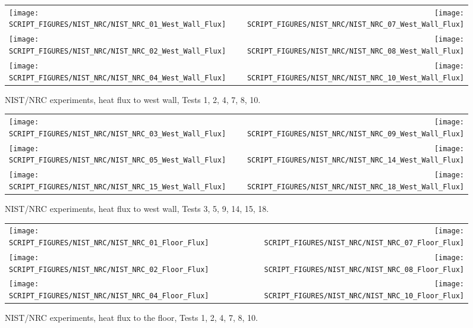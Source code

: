 \begin{figure}[p]
\begin{tabular*}{\textwidth}{l@{\extracolsep{\fill}}r}
\texttt{[image: SCRIPT\_FIGURES/NIST\_NRC/NIST\_NRC\_01\_West\_Wall\_Flux]} &
\texttt{[image: SCRIPT\_FIGURES/NIST\_NRC/NIST\_NRC\_07\_West\_Wall\_Flux]} \\
\texttt{[image: SCRIPT\_FIGURES/NIST\_NRC/NIST\_NRC\_02\_West\_Wall\_Flux]} &
\texttt{[image: SCRIPT\_FIGURES/NIST\_NRC/NIST\_NRC\_08\_West\_Wall\_Flux]} \\
\texttt{[image: SCRIPT\_FIGURES/NIST\_NRC/NIST\_NRC\_04\_West\_Wall\_Flux]} &
\texttt{[image: SCRIPT\_FIGURES/NIST\_NRC/NIST\_NRC\_10\_West\_Wall\_Flux]}
\end{tabular*}
\caption{NIST/NRC experiments, heat flux to west wall, Tests 1, 2, 4, 7, 8, 10.}
\label{NIST_NRC_West_Wall_Flux_Closed}
\end{figure}

\begin{figure}[p]
\begin{tabular*}{\textwidth}{l@{\extracolsep{\fill}}r}
\texttt{[image: SCRIPT\_FIGURES/NIST\_NRC/NIST\_NRC\_03\_West\_Wall\_Flux]} &
\texttt{[image: SCRIPT\_FIGURES/NIST\_NRC/NIST\_NRC\_09\_West\_Wall\_Flux]} \\
\texttt{[image: SCRIPT\_FIGURES/NIST\_NRC/NIST\_NRC\_05\_West\_Wall\_Flux]} &
\texttt{[image: SCRIPT\_FIGURES/NIST\_NRC/NIST\_NRC\_14\_West\_Wall\_Flux]} \\
\texttt{[image: SCRIPT\_FIGURES/NIST\_NRC/NIST\_NRC\_15\_West\_Wall\_Flux]} &
\texttt{[image: SCRIPT\_FIGURES/NIST\_NRC/NIST\_NRC\_18\_West\_Wall\_Flux]}
\end{tabular*}
\caption{NIST/NRC experiments, heat flux to west wall, Tests 3, 5, 9, 14, 15, 18.}
\label{NIST_NRC_West_Wall_Flux_Open}
\end{figure}

\begin{figure}[p]
\begin{tabular*}{\textwidth}{l@{\extracolsep{\fill}}r}
\texttt{[image: SCRIPT\_FIGURES/NIST\_NRC/NIST\_NRC\_01\_Floor\_Flux]} &
\texttt{[image: SCRIPT\_FIGURES/NIST\_NRC/NIST\_NRC\_07\_Floor\_Flux]} \\
\texttt{[image: SCRIPT\_FIGURES/NIST\_NRC/NIST\_NRC\_02\_Floor\_Flux]} &
\texttt{[image: SCRIPT\_FIGURES/NIST\_NRC/NIST\_NRC\_08\_Floor\_Flux]} \\
\texttt{[image: SCRIPT\_FIGURES/NIST\_NRC/NIST\_NRC\_04\_Floor\_Flux]} &
\texttt{[image: SCRIPT\_FIGURES/NIST\_NRC/NIST\_NRC\_10\_Floor\_Flux]}
\end{tabular*}
\caption{NIST/NRC experiments, heat flux to the floor, Tests 1, 2, 4, 7, 8, 10.}
\label{NIST_NRC_Floor_Flux_Closed}
\end{figure}

